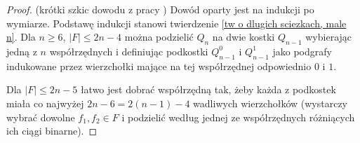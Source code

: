 \documentclass{pracamgr}
\begin{document}
   \begin{proof}
    (krótki szkic dowodu z pracy \cite{FG})\newline
    Dowód oparty jest na indukcji po wymiarze.
    Podstawę indukcji stanowi twierdzenie \ref{tw o dlugich sciezkach, male n}.
    Dla $n\ge6$, $|F|\le 2n-4$ można podzielić $Q_n$ na dwie kostki $Q_{n-1}$ wybierając jedną z $n$ współrzędnych 
    i definiując podkostki $Q^0_{n-1}$ i $Q^1_{n-1}$ jako podgrafy indukowane przez wierzchołki mające na tej współrzędnej odpowiednio $0$ i $1$.
    
    Dla $|F|\le 2n-5$ łatwo jest dobrać współrzędną tak, żeby każda z podkostek miała co najwyżej $2n-6=2(n-1)-4$ wadliwych wierzchołków
    (wystarczy wybrać dowolne $f_1,f_2\in F$ i podzielić według jednej ze współrzędnych różniących ich ciągi binarne).
    

\end{proof}
\end{document}
